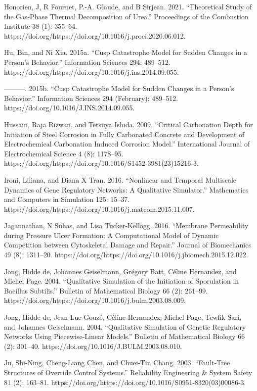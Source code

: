 \documentclass[utf8]{gradu3}
\begin{document}
Honorien, J, R Fournet, P.-A. Glaude, and B Sirjean. 2021. “Theoretical Study of the Gas-Phase Thermal Decomposition of Urea.” Proceedings of the Combustion Institute 38 (1): 355–64. https://doi.org/https://doi.org/10.1016/j.proci.2020.06.012.

Hu, Bin, and Ni Xia. 2015a. “Cusp Catastrophe Model for Sudden Changes in a Person’s Behavior.” Information Sciences 294: 489–512. https://doi.org/https://doi.org/10.1016/j.ins.2014.09.055.

———. 2015b. “Cusp Catastrophe Model for Sudden Changes in a Person’s Behavior.” Information Sciences 294 (February): 489–512. https://doi.org/10.1016/J.INS.2014.09.055.

Hussain, Raja Rizwan, and Tetsuya Ishida. 2009. “Critical Carbonation Depth for Initiation of Steel Corrosion in Fully Carbonated Concrete and Development of Electrochemical Carbonation Induced Corrosion Model.” International Journal of Electrochemical Science 4 (8): 1178–95. https://doi.org/https://doi.org/10.1016/S1452-3981(23)15216-3.

Ironi, Liliana, and Diana X Tran. 2016. “Nonlinear and Temporal Multiscale Dynamics of Gene Regulatory Networks: A Qualitative Simulator.” Mathematics and Computers in Simulation 125: 15–37. https://doi.org/https://doi.org/10.1016/j.matcom.2015.11.007.

Jagannathan, N Suhas, and Lisa Tucker-Kellogg. 2016. “Membrane Permeability during Pressure Ulcer Formation: A Computational Model of Dynamic Competition between Cytoskeletal Damage and Repair.” Journal of Biomechanics 49 (8): 1311–20. https://doi.org/https://doi.org/10.1016/j.jbiomech.2015.12.022.

Jong, Hidde de, Johannes Geiselmann, Grégory Batt, Céline Hernandez, and Michel Page. 2004. “Qualitative Simulation of the Initiation of Sporulation in Bacillus Subtilis.” Bulletin of Mathematical Biology 66 (2): 261–99. https://doi.org/https://doi.org/10.1016/j.bulm.2003.08.009.

Jong, Hidde de, Jean Luc Gouzé, Céline Hernandez, Michel Page, Tewfik Sari, and Johannes Geiselmann. 2004. “Qualitative Simulation of Genetic Regulatory Networks Using Piecewise-Linear Models.” Bulletin of Mathematical Biology 66 (2): 301–40. https://doi.org/10.1016/J.BULM.2003.08.010.

Ju, Shi-Ning, Cheng-Liang Chen, and Chuei-Tin Chang. 2003. “Fault-Tree Structures of Override Control Systems.” Reliability Engineering \& System Safety 81 (2): 163–81. https://doi.org/https://doi.org/10.1016/S0951-8320(03)00086-3.
\end{document}
